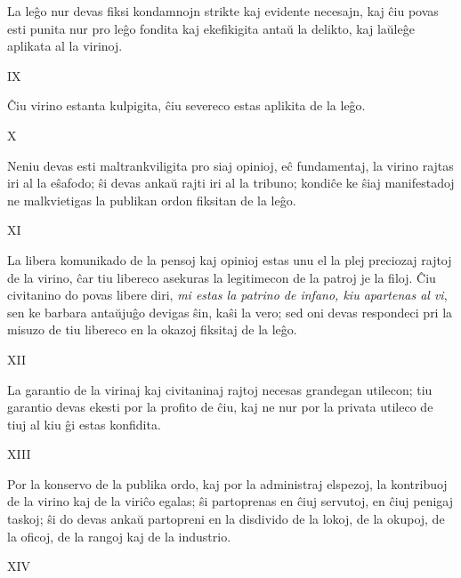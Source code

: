 \documentclass{book}
\begin{document}
La leĝo nur devas fiksi kondamnojn strikte kaj evidente necesajn, kaj
ĉiu povas esti punita nur pro leĝo fondita kaj ekefikigita antaŭ la
delikto, kaj laŭleĝe aplikata al la virinoj.

\vspace{1em}
\indent\indent\indent\indent IX
\vspace{0.5em}

Ĉiu virino estanta kulpigita, ĉiu severeco estas aplikita de la leĝo.

\vspace{1em}
\indent\indent\indent\indent X
\vspace{0.5em}

Neniu devas esti maltrankviligita pro siaj opinioj, eĉ fundamentaj, la virino rajtas iri al la eŝafodo; ŝi devas ankaŭ rajti iri al la tribuno; kondiĉe ke ŝiaj manifestadoj ne malkvietigas la publikan ordon fiksitan de la leĝo.

\vspace{1em}
\indent\indent\indent\indent XI
\vspace{0.5em}

La libera komunikado de la pensoj kaj opinioj estas unu el la plej preciozaj
rajtoj de la virino, ĉar tiu libereco asekuras la legitimecon de la patroj je la
filoj. Ĉiu civitanino do povas libere diri, \textit{mi estas la patrino de
infano, kiu apartenas al vi}, sen ke barbara antaŭjuĝo devigas ŝin, kaŝi la
vero; sed oni devas respondeci pri la misuzo de tiu libereco en la okazoj
fiksitaj de la leĝo.

\vspace{1em}
\indent\indent\indent\indent XII
\vspace{0.5em}

La garantio de la virinaj kaj civitaninaj rajtoj necesas grandegan utilecon; tiu garantio devas ekesti por la profito de ĉiu, kaj ne nur por la privata utileco de tiuj al kiu ĝi estas konfidita.

\vspace{1em}
\indent\indent\indent\indent XIII
\vspace{0.5em}

Por la konservo de la publika ordo, kaj por la administraj elspezoj, la kontribuoj de la virino kaj de la viriĉo egalas; ŝi partoprenas en ĉiuj servutoj, en ĉiuj penigaj taskoj; ŝi do devas ankaŭ partopreni en la disdivido de la lokoj, de la okupoj, de la oficoj, de la rangoj kaj de la industrio.

\vspace{1em}
\indent\indent\indent\indent XIV
\vspace{0.5em}
\end{document}
